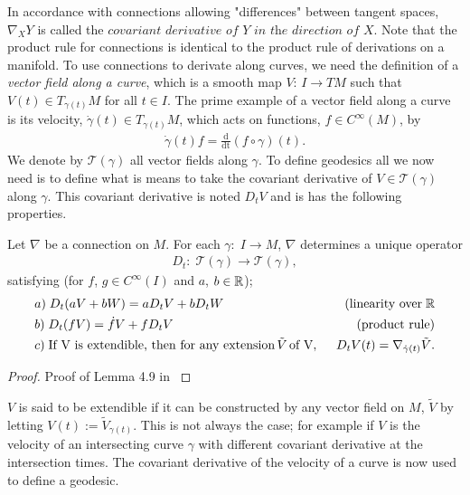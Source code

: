 In accordance with connections allowing "differences" between tangent spaces, $ \nabla_X Y $ is called the $\textit{covariant derivative of Y in the direction of X}$. Note that the product rule for connections is identical to the product rule of derivations on a manifold. To use connections to derivate along curves, we need the definition of a \textit{vector field along a curve}, which is a smooth map $V: \, I \rightarrow TM$ such that $V(t) \in T_{\gamma(t)} M$ for all $t \in I$. The prime example of a vector field along a curve is its velocity, $\dot{\gamma}(t) \in T_{\gamma(t)} M$, which acts on functions, $f \in C^\infty(M)$, by
\begin{align*}
\dot{\gamma}(t) f = \frac{\text{d}}{\text{dt}} (f \circ \gamma)(t).
\end{align*} 
We denote by $\mathcal{T}(\gamma)$ all vector fields along $\gamma$. 
To define geodesics all we now need is to define what is means to take the covariant derivative of $V \in \mathcal{T}(\gamma)$ along $\gamma$. This covariant derivative is noted $D_t V$ and is has the following properties.

\begin{lemma}
Let $\nabla$ be a connection on $M$. For each $\gamma: \; I \rightarrow M$, $\nabla$ determines a unique operator
\begin{align*}
D_t: \; \mathcal{T}(\gamma) \rightarrow \mathcal{T}(\gamma),
\end{align*} 
satisfying (for $f$, $g \in C^\infty(I)$ and $a$, $b \in \mathbb{R}$);
\begin{align*}
& a) \; D_t(aV + bW) = aD_tV + bD_tW & \text{(linearity over} \; \mathbb{R} \\
& b) \; D_t(fV) = \dot{f}V + fD_tV & \text{(product rule)} \\
& c) \; \text{If V is extendible, then for any extension} \, \tilde{V} \, \text{of V}, \; \; & D_tV(t) = \nabla_{\dot{\gamma}(t)} \tilde{V}.
\end{align*}
\end{lemma}
\begin{proof}
Proof of Lemma 4.9 in \cite{lee2006riemannian}
\end{proof}

$V$ is said to be extendible if it can be constructed by any vector field on $M$, $\tilde{V}$ by letting $V(t) := \tilde{V}_{\gamma(t)}$. This is not always the case; for example if $V$ is the velocity of an intersecting curve $\gamma$ with different covariant derivative at the intersection times. The covariant derivative of the velocity of a curve is now used to define a geodesic.

